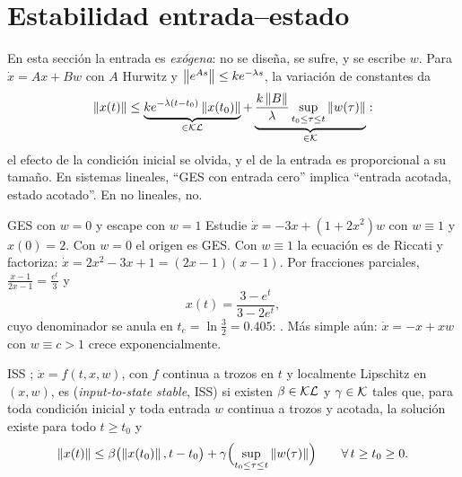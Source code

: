 \section{Estabilidad entrada--estado}
\label{sec:av-iss}

En esta sección la entrada es \emph{exógena}: no se diseña, se sufre, y se escribe $w$. Para $\dot x=Ax+Bw$ con $A$ Hurwitz y $\left\lVert e^{As}\right\rVert\le ke^{-\lambda s}$, la variación de constantes da
\begin{equation}
  \left\lVert x(t)\right\rVert\le\underbrace{ke^{-\lambda(t-t_0)}\left\lVert x(t_0)\right\rVert}_{\in\mathcal{KL}}+\underbrace{\frac{k\left\lVert B\right\rVert}{\lambda}\sup_{t_0\le\tau\le t}\left\lVert w(\tau)\right\rVert}_{\in\mathcal{K}} :
  \label{eq:av-isslineal}
\end{equation}
el efecto de la condición inicial se olvida, y el de la entrada es proporcional a su tamaño. En sistemas lineales, ``GES con entrada cero'' implica ``entrada acotada, estado acotado''. En no lineales, no.

\begin{ejemplo}[label=ej:av-riccati]{GES con $w=0$ y escape con $w=1$}
Estudie $\dot x=-3x+(1+2x^2)w$ con $w\equiv1$ y $x(0)=2$.
\solucion Con $w=0$ el origen es GES. Con $w\equiv1$ la ecuación es de Riccati y factoriza: $\dot x=2x^2-3x+1=(2x-1)(x-1)$. Por fracciones parciales, $\frac{x-1}{2x-1}=\frac{e^t}{3}$ y
\[
  x(t)=\frac{3-e^t}{3-2e^t} ,
\]
cuyo denominador se anula en $t_e=\ln\tfrac32=0.405$: . Más simple aún: $\dot x=-x+xw$ con $w\equiv c>1$ crece exponencialmente.
\end{ejemplo}

\begin{definicion}[label=def:av-iss]{ISS \citep{Son89a}; \citep[Def.~4.7]{Kha02}}
$\dot x=f(t,x,w)$, con $f$ continua a trozos en $t$ y localmente Lipschitz en $(x,w)$, es  (\emph{input-to-state stable}, ISS) si existen $\beta\in\mathcal{KL}$ y $\gamma\in\mathcal{K}$ tales que, para toda condición inicial y toda entrada $w$ continua a trozos y acotada, la solución existe para todo $t\ge t_0$ y
\begin{equation}
  \left\lVert x(t)\right\rVert\le\beta\bigl(\left\lVert x(t_0)\right\rVert,t-t_0\bigr)+\gamma\Bigl(\sup_{t_0\le\tau\le t}\left\lVert w(\tau)\right\rVert\Bigr)\qquad\forall\,t\ge t_0\ge0 .
  \label{eq:av-iss}
\end{equation}
\end{definicion}

